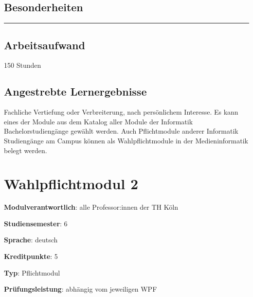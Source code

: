 \hypertarget{besonderheitenpathlabel....srcmodulbeschreibungen-bachelor-bpo5ba_wpf-1}{%
\section*{Besonderheiten\label{../../src/modulbeschreibungen-bachelor-bpo5/BA_WPF-1}}\label{besonderheitenpathlabel....srcmodulbeschreibungen-bachelor-bpo5ba_wpf-1}}

\begin{center}\rule{0.5\linewidth}{0.5pt}\end{center}

\hypertarget{arbeitsaufwandpathlabel....srcmodulbeschreibungen-bachelor-bpo5ba_wpf-1}{%
\section*{Arbeitsaufwand\label{../../src/modulbeschreibungen-bachelor-bpo5/BA_WPF-1}}\label{arbeitsaufwandpathlabel....srcmodulbeschreibungen-bachelor-bpo5ba_wpf-1}}

150 Stunden

\hypertarget{angestrebte-lernergebnissepathlabel....srcmodulbeschreibungen-bachelor-bpo5ba_wpf-1}{%
\section*{Angestrebte
Lernergebnisse\label{../../src/modulbeschreibungen-bachelor-bpo5/BA_WPF-1}}\label{angestrebte-lernergebnissepathlabel....srcmodulbeschreibungen-bachelor-bpo5ba_wpf-1}}

Fachliche Vertiefung oder Verbreiterung, nach persönlichem Interesse. Es
kann eines der Module aus dem Katalog aller Module der Informatik
Bachelorstudiengänge gewählt werden. Auch Pflichtmodule anderer
Informatik Studiengänge am Campus können als Wahlpflichtmodule in der
Medieninformatik belegt werden.

\hypertarget{wahlpflichtmodul-2pathlabel....srcmodulbeschreibungen-bachelor-bpo5ba_wpf-2}{%
\chapter{Wahlpflichtmodul
2\label{../../src/modulbeschreibungen-bachelor-bpo5/BA_WPF-2}}\label{wahlpflichtmodul-2pathlabel....srcmodulbeschreibungen-bachelor-bpo5ba_wpf-2}}

\begin{modulHead}
\textbf{Modulverantwortlich}: alle Professor:innen
der TH Köln
\end{modulHead}
\begin{modulHead}
\textbf{Studiensemester}:
6
\end{modulHead}
\begin{modulHead}
\textbf{Sprache}:
deutsch
\end{modulHead}
\begin{modulHead}
\textbf{Kreditpunkte}:
5
\end{modulHead}
\begin{modulHead}
\textbf{Typ}:
Pflichtmodul
\end{modulHead}
\begin{modulHead}
\textbf{Prüfungsleistung}:
abhängig vom jeweiligen WPF
\end{modulHead}


